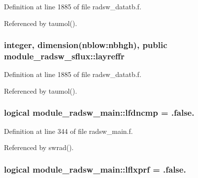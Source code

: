 Definition at line 1885 of file radsw\+\_\+datatb.\+f.



Referenced by taumol().

\subsubsection[{\texorpdfstring{layreffr}{layreffr}}]{\setlength{\rightskip}{0pt plus 5cm}integer, dimension(nblow\+:nbhgh), public module\+\_\+radsw\+\_\+sflux\+::layreffr}\hypertarget{group__module__radsw__main_ga90c56da1bcadbea0b42e12487c1c1eec}{}\label{group__module__radsw__main_ga90c56da1bcadbea0b42e12487c1c1eec}


Definition at line 1885 of file radsw\+\_\+datatb.\+f.



Referenced by taumol().

\subsubsection[{\texorpdfstring{lfdncmp}{lfdncmp}}]{\setlength{\rightskip}{0pt plus 5cm}logical module\+\_\+radsw\+\_\+main\+::lfdncmp = .false.\hspace{0.3cm}{\ttfamily [private]}}\hypertarget{group__module__radsw__main_ga8c0a241d6c1aa69fee4cd24fdbc4256b}{}\label{group__module__radsw__main_ga8c0a241d6c1aa69fee4cd24fdbc4256b}


Definition at line 344 of file radsw\+\_\+main.\+f.



Referenced by swrad().

\subsubsection[{\texorpdfstring{lflxprf}{lflxprf}}]{\setlength{\rightskip}{0pt plus 5cm}logical module\+\_\+radsw\+\_\+main\+::lflxprf = .false.\hspace{0.3cm}{\ttfamily [private]}}\hypertarget{group__module__radsw__main_gac4ab674edb40fda0c89aa8ee331ccdc6}{}\label{group__module__radsw__main_gac4ab674edb40fda0c89aa8ee331ccdc6}


